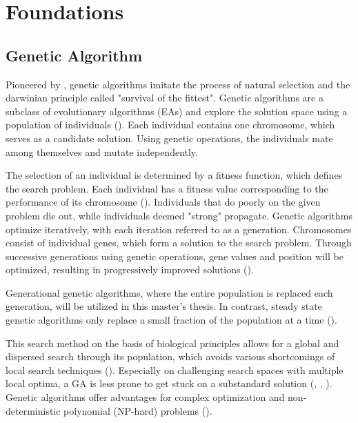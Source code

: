 \chapter{Foundations}
\label{chap:foundations}

\section{Genetic Algorithm}
\label{sect:foundations:genetic_algorithm}

Pioneered by \cite{holland_adaptation_1992}, genetic algorithms imitate the process of natural selection and the darwinian principle called "survival of the fittest". Genetic algorithms are a subclass of evolutionary algorithms (EAs) and explore the solution space using a population of individuals (\cite{mills_determining_2015}). Each individual contains one chromosome, which serves as a candidate solution. Using genetic operations, the individuals mate among themselves and mutate independently. 

The selection of an individual is determined by a fitness function, which defines the search problem. Each individual has a fitness value corresponding to the performance of its chromosome (\cite{majumdar_genetic_2015}). Individuals that do poorly on the given problem die out, while individuals deemed "strong" propagate. Genetic algorithms optimize iteratively, with each iteration referred to as a generation. Chromosomes consist of individual genes, which form a solution to the search problem. Through successive generations using genetic operations, gene values and position will be optimized, resulting in progressively improved solutions (\cite{srinivas_genetic_1994}).

Generational genetic algorithms, where the entire population is replaced each generation, will be utilized in this master's thesis. In contrast, steady state genetic algorithms only replace a small fraction of the population at a time (\cite{srinivas_genetic_1994}).

This search method on the basis of biological principles allows for a global and dispersed search through its population, which avoids various shortcomings of local search techniques (\cite{grefenstette_optimization_1986}). Especially on challenging search spaces with multiple local optima, a GA is less prone to get stuck on a substandard solution (\cite{katoch_review_2021}, \cite{xia_genetic_2019}, \cite{majumdar_genetic_2015}). Genetic algorithms offer advantages for complex optimization and non-deterministic polynomial (NP-hard) problems (\cite{hussain_trade-off_2020}).


